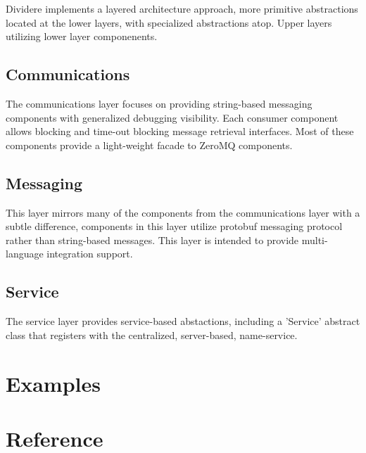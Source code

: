 \documentclass[fontsize=12pt]{book}
\newcommand{\insertPython}[1]{ 
\begin{tcolorbox}[title=#1,coltitle=lightgray,width=6in]

\end{tcolorbox}
}
\begin{document}
Dividere implements a layered architecture approach, more primitive abstractions located at the lower layers, with specialized abstractions atop.  Upper layers utilizing lower layer componenents.

\section{Communications}
The communications layer focuses on providing string-based messaging components with generalized debugging visibility.  Each consumer component allows blocking and time-out blocking message retrieval interfaces.  Most of these components provide a light-weight facade to ZeroMQ components.

\section{Messaging}
This layer mirrors many of the components from the communications layer with a subtle difference, components in this layer utilize protobuf messaging protocol rather than string-based messages.  This layer is intended to provide multi-language integration support.

\section{Service}
The service layer provides service-based abstactions, including a 'Service' abstract class that registers with the centralized, server-based, name-service.


\chapter{Examples}
\insertPython{simplePubSub.py}
\insertPython{msgReactor.py}

\chapter{Reference}

\end{document}
